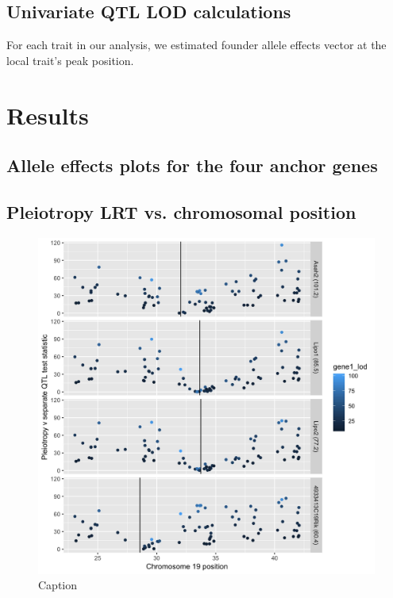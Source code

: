 \documentclass{article}
\begin{document}
\subsection{Univariate QTL LOD calculations}





For each trait in our analysis, we estimated founder allele effects vector at the local trait’s peak position. 







\section{Results}

\subsection{Allele effects plots for the four anchor genes}

\subsection{Pleiotropy LRT vs. chromosomal position}

\begin{figure}
    \centering
    \includegraphics[width = \textwidth]{2018-12-04_lrt-v-middle-of-gene.jpg}
    \caption{Caption}
    \label{fig:middle}
\end{figure}
\end{document}
